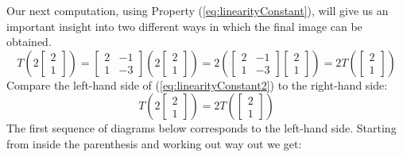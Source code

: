 \documentclass{ximera}
\begin{document}
\begin{exploration}
Our next computation, using Property (\ref{eq:linearityConstant}), will give us an important insight into two different ways in which the final image can be obtained. 
\begin{equation}\label{eq:linearityConstant2}
T\left(2\begin{bmatrix}2\\1\end{bmatrix}\right)=\begin{bmatrix}2&-1\\1&-3\end{bmatrix}\left(2\begin{bmatrix}2\\1\end{bmatrix}\right)=2\left(\begin{bmatrix}2&-1\\1&-3\end{bmatrix}\begin{bmatrix}2\\1\end{bmatrix}\right)=2T\left(\begin{bmatrix}2\\1\end{bmatrix}\right)
\end{equation}
Compare the left-hand side of (\ref{eq:linearityConstant2}) to the right-hand side:
\begin{equation*}
T\left(2\begin{bmatrix}2\\1\end{bmatrix}\right)=2T\left(\begin{bmatrix}2\\1\end{bmatrix}\right)
\end{equation*}
The first sequence of diagrams below corresponds to the left-hand side.  Starting from inside the parenthesis and working out way out we get:
\begin{center}
   \quad\quad
{}
\end{center}
\end{exploration}
\end{document}

